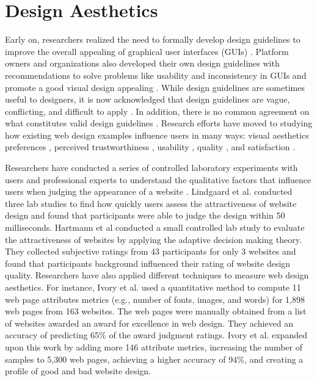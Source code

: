 \section{Design Aesthetics}

Early on, researchers realized the need to formally develop design guidelines to improve the overall appealing of graphical user interfaces (GUIs) \cite{Gould_1983_CHI, hewett_1986_CHI}.
Platform owners and organizations also developed their own design guidelines with recommendations to solve problems like usability and inconsistency in GUIs and promote a good visual design appealing \cite{Web_Design_W3C,Design_for_Android, Design_for_iOS, Design_for_Windows}.
While design guidelines are sometimes useful to designers, it is now acknowledged that design guidelines are vague, conflicting, and difficult to apply \cite{borges_1996_CHI_Guidelines,de_1990_INTERACT_Guidelines,lowgren_1992_CHI_knowledge,ivory_2001_CHI_empirically}.
In addition, there is no common agreement on what constitutes valid design guidelines \cite{ratner_1996_CHIComp_characterization}.
Research efforts have moved to studying how existing web design examples influence users in many ways: visual aesthetics preferences \cite{reinecke_2011_TOCHI,reinecke_2013_CHI,reinecke_2014_CHI}, perceived trustworthiness \cite{Basso_EC_2001,lindgaard_2011_TOCHI_trustworthiness}, usability \cite{Gould_1983_CHI,tractinsky_1997_CHI_aesthetics,krug_2005_book,van_2008_IC_modelling}, quality \cite{hartmann_2008_TOCHI}, and satisfaction \cite{teo_2003_HCS_empirical}.

Researchers have conducted a series of controlled laboratory experiments with users and professional experts to understand the qualitative factors that influence users when judging the appearance of a website \cite{teo_2003_HCS_empirical, lavie_2004_HCS_assessing, hartmann_2008_TOCHI}. 
Lindgaard et al. \cite{lindgaard_2006_BIT_attention} conducted three lab studies to find how quickly users assess the attractiveness of website design and found that participants were able to judge the design within 50 milliseconds.
Hartmann et al \cite{Hartmann_CHI_2008} conducted a small controlled lab study to evaluate the attractiveness of websites by applying the adaptive decision making theory.
They collected subjective ratings from 43 participants for only 3 websites and found that participants background influenced their rating of website design quality.
Researchers have also applied different techniques to measure web design aesthetics. 
For instance, Ivory et al. \cite{ivory_2001_CHI_empirically} used a quantitative method to compute 11 web page attributes metrics (e.g., number of fonts, images, and words) for 1,898 web pages from 163 websites.
The web pages were manually obtained from a list of websites awarded an award for excellence in web design.
They achieved an accuracy of predicting 65\% of the award judgment ratings.
Ivory et al. \cite{ivory_statistical_2002} expanded upon this work by adding more 146 attribute metrics, increasing the number of samples to 5,300 web pages, achieving a higher accuracy of 94\%, and creating a profile
of good and bad website design.

